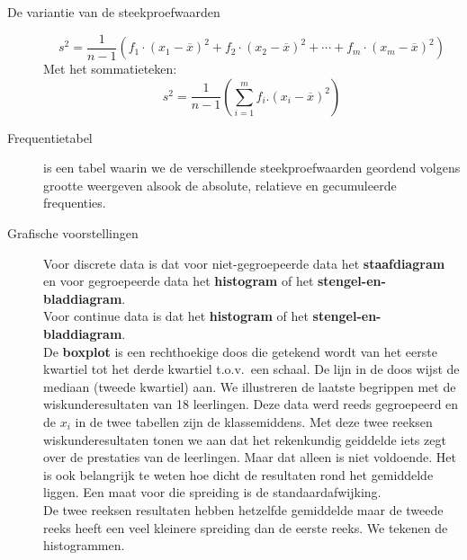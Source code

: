 \begin{small}
\begin{description}
\item[De variantie van de steekproefwaarden] 
$$s^2=\frac{1}{n-1}\left(f_1\cdot(x_1-\overline{x})^2+f_2\cdot (x_2-\overline{x})^2+\cdots +f_m\cdot (x_m-\overline{x})^2\right)$$
Met het sommatieteken:
$$s^2=\frac{1}{n-1}\left( \sum_{i=1}^mf_i.(x_i-\overline{x})^2\right) $$
\item[Frequentietabel] is een tabel waarin we de verschillende steekproefwaarden geordend volgens grootte weergeven alsook  de absolute, relatieve en gecumuleerde frequenties.
\item[Grafische voorstellingen]

Voor discrete data is dat voor niet-gegroepeerde data het {\bf staafdiagram} en voor gegroepeerde data het {\bf histogram} of het {\bf stengel-en-bladdiagram}.\\
Voor continue data is dat het {\bf histogram} of het {\bf stengel-en-bladdiagram}.\\
De {\bf boxplot} 
is een rechthoekige doos die getekend wordt van het eerste kwartiel tot het derde kwartiel t.o.v.\ een schaal. De lijn in de doos wijst de mediaan (tweede kwartiel) aan.
We illustreren de laatste begrippen met de wiskunderesultaten van 18 leerlingen. Deze data werd reeds gegroepeerd en de $x_i$ in de twee tabellen zijn de klassemiddens.  Met deze twee reeksen wiskunderesultaten  tonen we aan dat het rekenkundig geiddelde iets zegt over de prestaties van de leerlingen. Maar dat  alleen is niet voldoende. Het is ook belangrijk te weten hoe dicht de resultaten rond het gemiddelde liggen. Een maat voor die spreiding is de standaardafwijking. \\
De twee reeksen resultaten hebben hetzelfde gemiddelde maar de tweede reeks  heeft een veel kleinere spreiding dan de eerste reeks.
We tekenen de histogrammen.




\end{description}
\end{small}
